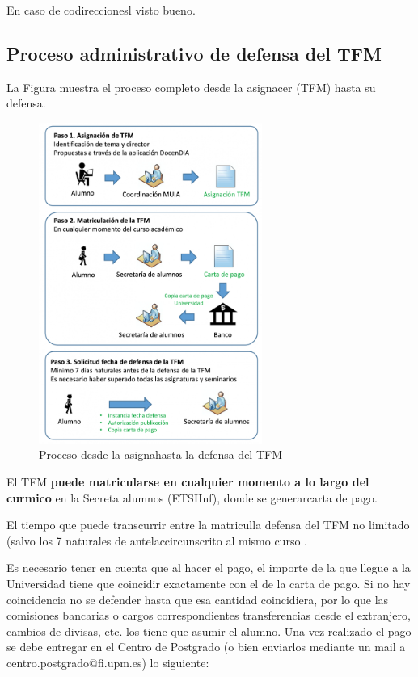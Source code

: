 En caso de codireccionesl visto bueno.


\subsection{Proceso administrativo de defensa del TFM}
\noindent La Figura \label{fig:proceso} muestra el proceso completo desde la asignacer (TFM) hasta su defensa.

\begin{figure}[h]
    \centering
    \includegraphics[width=0.65\textwidth]{recursos/Proceso}
    \caption{Proceso desde la asignahasta la defensa del TFM}
    \label{fig:proceso}
\end{figure}


El TFM {\bf puede matricularse en cualquier momento a lo largo del curmico} en la Secreta alumnos (ETSIInf), donde se generarcarta de pago.

El tiempo que puede transcurrir entre la matriculla defensa del TFM no limitado (salvo los 7 naturales de antelaccircunscrito al mismo curso .

Es necesario tener en cuenta que al hacer el pago, el importe de la que llegue a la Universidad tiene que coincidir exactamente con el de la carta de pago. Si no hay coincidencia no se defender hasta que esa cantidad coincidiera, por lo que las comisiones bancarias o cargos correspondientes transferencias desde el extranjero, cambios de divisas, etc. los tiene que asumir el alumno. Una vez realizado el pago se debe entregar en el Centro de Postgrado (o bien enviarlos mediante un mail a centro.postgrado@fi.upm.es) lo siguiente:


